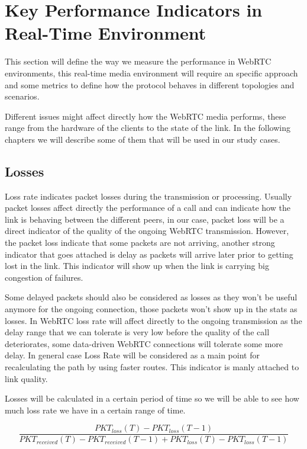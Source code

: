 \section{Key Performance Indicators in Real-Time Environment}


\thispagestyle{empty}

This section will define the way we measure the performance in WebRTC environments, this real-time media environment will require an specific approach and some metrics to define how the protocol behaves in different topologies and scenarios. 

Different issues might affect directly how the WebRTC media performs, these range from the hardware of the clients to the state of the link. In the following chapters we will describe some of them that will be used in our study cases.

\subsection{Losses}

Loss rate indicates packet losses during the transmission or processing. Usually packet losses affect directly the performance of a call and can indicate how the link is behaving between the different peers, in our case, packet loss will be a direct indicator of the quality of the ongoing WebRTC transmission. However, the packet loss indicate that some packets are not arriving, another strong indicator that goes attached is delay as packets will arrive later prior to getting lost in the link. This indicator will show up when the link is carrying big congestion of failures. 

Some delayed packets should also be considered as losses as they won't be useful anymore for the ongoing connection, those packets won't show up in the stats as losses. In WebRTC loss rate will affect directly to the ongoing transmission as the delay range that we can tolerate is very low before the quality of the call deteriorates, some data-driven WebRTC connections will tolerate some more delay. In general case Loss Rate will be considered as a main point for recalculating the path by using faster routes. This indicator is manly attached to link quality.

Losses will be calculated in a certain period of time so we will be able to see how much loss rate we have in a certain range of time.

\begin{equation}
	\frac{PKT_{loss}(T) - PKT_{loss}(T-1)}{PKT_{received}(T) - PKT_{received}(T-1) + PKT_{loss}(T) - PKT_{loss}(T-1)}
	\label{eq:PKTloss}
\end{equation}

